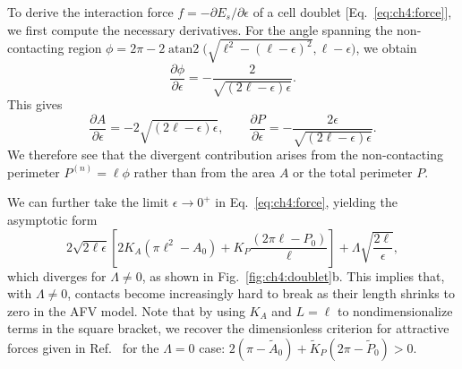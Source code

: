 To derive the interaction force $f=-\partial E_s/\partial \epsilon$ of a cell doublet [Eq.~\eqref{eq:ch4:force}], we first compute the necessary derivatives. For the angle spanning the non-contacting region $\phi=2\pi-2\operatorname{atan2}\bigl(\sqrt{\ell^2-(\ell-\epsilon)^2},\ell-\epsilon\bigr)$, we obtain
\begin{equation}
    \frac{\partial\phi}{\partial\epsilon}=-\frac{2}{\sqrt{(2\ell-\epsilon)\epsilon}}.
\end{equation}
This gives
\begin{equation}
    \frac{\partial A}{\partial \epsilon} = -2\sqrt{(2\ell-\epsilon)\epsilon},\qquad\frac{\partial P}{\partial \epsilon}=-\frac{2\epsilon}{\sqrt{(2\ell-\epsilon)\epsilon}}.
\end{equation}
We therefore see that the divergent contribution arises from the non-contacting perimeter $P^{(n)}=\ell\phi$ rather than from the area $A$ or the total perimeter $P$.

We can further take the limit $\epsilon\to0^+$ in Eq.~\eqref{eq:ch4:force}, yielding the asymptotic form
\begin{equation}
\label{eq:ch4:force-asymp}
    2\sqrt{2\ell\epsilon}\left[2K_A(\pi\ell^2-A_0) + K_P\frac{(2\pi\ell-P_0)}{\ell}\right] + {\Lambda}\sqrt{\frac{2\ell}{\epsilon}},
\end{equation}
which diverges for $\Lambda\neq 0$, as shown in Fig.~\ref{fig:ch4:doublet}b.
This implies that, with $\Lambda\neq 0$, contacts become increasingly hard to break as their length shrinks to zero in the AFV model.
Note that by using $K_A$ and $L=\ell$ to nondimensionalize terms in the square bracket, we recover the dimensionless criterion for attractive forces given in Ref.~\cite{teomy2018confluent} for the $\Lambda=0$ case:
$
    2(\pi-\tilde{A}_0) + \tilde{K}_P(2\pi-\tilde{P}_0)>0
$.
